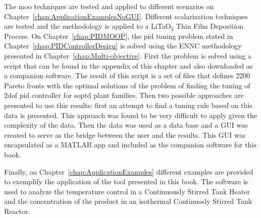The \gls{moo} techniques are tested and applied to different scenarios on Chapter~\ref{chap:ApplicationExamplesNoGUI}. Different scalarization techniques are tested and the methodology is applied to a LiTaO$_3$ Thin Film Deposition Process. On Chapter~\ref{chap:PIDMOOP}, the \gls{pid} tuning problem stated in Chapter~\ref{chap:PIDControllerDesign} is solved using the ENNC methodology presented in Chapter~\ref{chap:Multi-objective}. First the problem is solved using a \matlab script that can be found in the appendix of this chapter and also downloaded as a companion software. The result of this script is a set of files that defines 2200 Pareto fronts with the optimal solutions of the problem of finding the tuning of \gls{2dof} \gls{pid} controller for \gls{soptd} plant families. Then two possible approaches are presented to use this results: first an attempt to find a tuning rule based on this data is presented. This approach was found to be very difficult to apply given the complexity of the data. Then the data was used as a data base and a GUI was created to serve as the bridge between the user and the results. This GUI was encapsulated as a MATLAB app and included as the companion software for this book.

Finally, on Chapter~\ref{chap:ApplicationExamples} different examples are provided to exemplify the application of the tool presented in this book. The software is used to analyze the temperature control in a Continuously Stirred Tank Heater and the concentration of the product in an isothermal Continuosly Stirred Tank Reactor.


